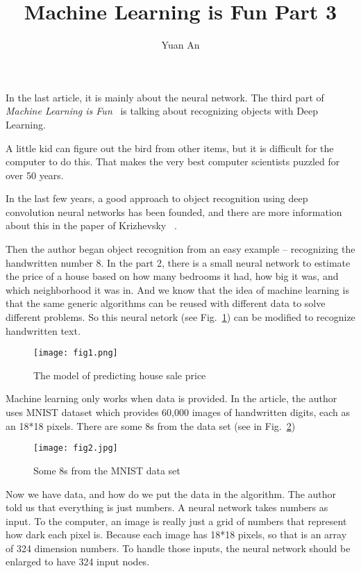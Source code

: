 \documentclass[10pt,twocolumn,letterpaper]{article}
\begin{document}
	\title{Machine Learning is Fun Part 3}	
	\author{Yuan An}
	\maketitle
	In the last article, it is mainly about the neural network. The third part of \emph{Machine Learning is Fun}~\cite{MLisFun} is talking about recognizing objects with Deep Learning.
	\par
	A little kid can figure out the bird from other items, but it is difficult for the computer to do this. That makes the very best computer scientists puzzled for over 50 years.
	\par
	In the last few years, a good approach to object recognition using deep convolution neural networks has been founded, and there are  more information about this in the paper of Krizhevsky \etal~\cite{Krizhevsky2012ImageNet}.
	\par
	Then the author began object recognition from an easy example -- recognizing the handwritten number 8. In the part 2, there is a small neural network to estimate the price of a house based on how many bedrooms it had, how big  it was, and which neighborhood it was in. And we know that the idea of machine learning is that the same generic algorithms can be reused with different data to solve different problems. So this neural netork (see Fig.~\ref{fig1}) can be modified to recognize handwritten text.
	\begin{figure}[h]
		\centering
		\texttt{[image: fig1.png]}
		\caption{The model of predicting house sale price} \label{fig1}
	\end{figure}
	\par
	Machine learning only works when data is provided. In the article, the author uses MNIST dataset which provides 60,000 images of handwritten digits, each as an 18*18 pixels. There are some 8s from the data set (see in Fig.~\ref{fig2})
	\begin{figure}[h]
	\centering
	\texttt{[image: fig2.jpg]}
	\caption{Some 8s from the MNIST data set}\label{fig2}
	\end{figure}
	\par
	Now we have data, and how do we put the data in the algorithm. The author told us that everything is just numbers. A neural network takes numbers as input. To the computer, an image is really just a grid of numbers that represent how dark each pixel is. Because each image has 18*18 pixels, so that is an array of 324 dimension numbers. To handle those inputs, the neural network should be enlarged to have 324 input nodes.
\end{document}
